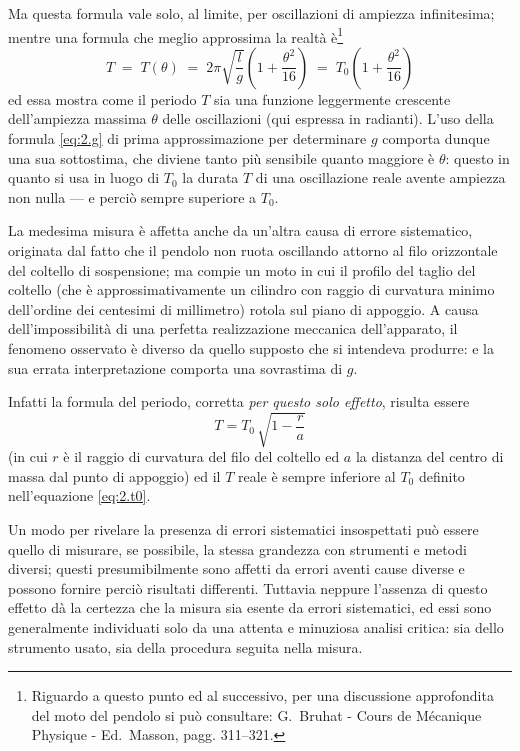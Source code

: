 \begin{enumerate}
  Ma questa formula vale solo, al limite, per oscillazioni
  di ampiezza infinitesima; mentre una formula che meglio
  approssima la realt\`a \`e\/\footnote{Riguardo a questo
    punto ed al successivo, per una discussione approfondita
    del moto del pendolo si pu\`o consultare: G.~Bruhat -
    Cours de M\'ecanique Physique - Ed.\ Masson, pagg.
    311--321.}
  \begin{equation*}
    T \; = \;T(\theta) \; = \; 2 \pi \sqrt{ \frac{l}{g} }
    \left( 1 + \frac{\theta^2}{16} \right) \; = \;
    T_0 \left( 1 + \frac{\theta^2}{16} \right)
  \end{equation*}
  ed essa mostra come il periodo $T$ sia una funzione
  leggermente crescente dell'ampiezza massima $\theta$ delle
  oscillazioni (qui espressa in radianti).  L'uso della
  formula \eqref{eq:2.g} di prima approssimazione per
  determinare $g$ comporta dunque una sua sottostima, che
  diviene tanto pi\`u sensibile quanto maggiore \`e
  $\theta$: questo in quanto si usa in luogo di $T_0$ la
  durata $T$ di una oscillazione reale avente ampiezza non
  nulla --- e perci\`o sempre superiore a $T_0$.

  La medesima misura \`e affetta anche da un'altra causa di
  errore sistematico, originata dal fatto che il pendolo non
  ruota oscillando attorno al filo orizzontale del coltello
  di sospensione; ma compie un moto in cui il profilo del
  taglio del coltello (che \`e approssimativamente un
  cilindro con raggio di curvatura minimo dell'ordine dei
  centesimi di millimetro) rotola sul piano di appoggio.  A
  causa dell'impossibilit\`a di una perfetta realizzazione
  meccanica dell'apparato, il fenomeno osservato \`e diverso
  da quello supposto che si intendeva produrre: e la sua
  errata interpretazione comporta una sovrastima di $g$.

  Infatti la formula del periodo, corretta \emph{per questo
    solo effetto}, risulta essere
  \begin{equation*}
    T = T_0 \, \sqrt{ 1 - \frac{r}{a} }
  \end{equation*}
  (in cui $r$ \`e il raggio di curvatura del filo del
  coltello ed $a$ la distanza del centro di massa dal punto
  di appoggio) ed il $T$ reale \`e sempre inferiore al $T_0$
  definito nell'equazione \eqref{eq:2.t0}.
\end{enumerate}%

Un modo per rivelare la presenza di errori sistematici
insospettati pu\`o essere quello di misurare, se possibile,
la stessa grandezza con strumenti e metodi diversi; questi
presumibilmente sono affetti da errori aventi cause diverse
e possono fornire perci\`o risultati differenti.  Tuttavia
neppure l'assenza di questo effetto d\`a la certezza che la
misura sia esente da errori sistematici, ed essi sono
generalmente individuati solo da una attenta e minuziosa
analisi critica: sia dello strumento usato, sia della
procedura seguita nella misura.

